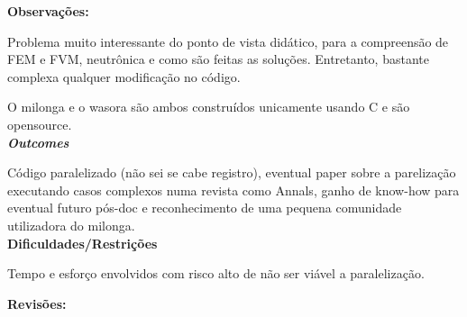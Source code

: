 \textbf{Observações:}

Problema muito interessante do ponto de vista didático, para a compreensão 
de FEM e FVM, neutrônica e como são feitas as soluções. Entretanto, bastante 
complexa qualquer modificação no código.

O milonga e o wasora são ambos construídos unicamente usando C e são opensource.\\

\textbf{\textit{Outcomes}}

Código paralelizado (não sei se cabe registro), eventual paper sobre a parelização 
executando casos complexos numa revista como Annals, ganho de know-how para eventual futuro pós-doc e reconhecimento de uma pequena comunidade utilizadora 
do milonga.\\

\textbf{Dificuldades/Restrições}

Tempo e esforço envolvidos com risco alto de não ser viável a paralelização.

\textbf{Revisões:}
\date{22 de novembro de 2018}
